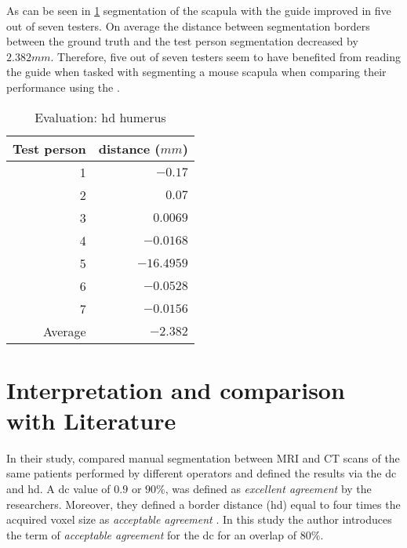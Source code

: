 \noindent
As can be seen in \cref{tab:humerus-distance} segmentation of the scapula with the guide improved in five out of seven testers.
On average the distance between segmentation borders between the ground truth and the test person segmentation decreased by $2.382mm$.
Therefore, five out of seven testers seem to have benefited from reading the guide when tasked with segmenting a mouse scapula 
when comparing their performance using the .
\begin{table}[ht]
	\begin{center}
		\begin{tabular}{r r}
			\textbf{Test person} & \textbf{distance ($mm$)} \\
			\hline
			1                    & $-0.17$                  \\
			2                    & $0.07$                   \\
			3                    & $0.0069$                 \\
			4                    & $-0.0168$                \\
			5                    & $-16.4959$               \\
			6                    & $-0.0528$                \\
			7                    & $-0.0156$                \\
			\hline
			Average              & $-2.382$                 \\
		\end{tabular}
		\caption{Evaluation: \acrshort{hd} humerus}\label{tab:humerus-distance}
	\end{center}
\end{table}

\section{Interpretation and comparison with Literature}
In their study, \citeauthor{andersenAccuracyPrecisionManual2018} compared manual segmentation between MRI and CT scans of the same patients performed by 
different operators and defined the results via the \acrfull{dc} and \acrfull{hd}.
A \acrshort{dc} value of $0.9$ or $90\%$, was defined as \textit{excellent agreement} by the researchers.
Moreover, they defined a border distance (\acrshort{hd}) equal to four times the acquired voxel size 
as \textit{acceptable agreement} \cite{andersenAccuracyPrecisionManual2018}.
In this study the author introduces the term of \textit{acceptable agreement} for the \acrshort{dc} for an overlap of $80\%$.

